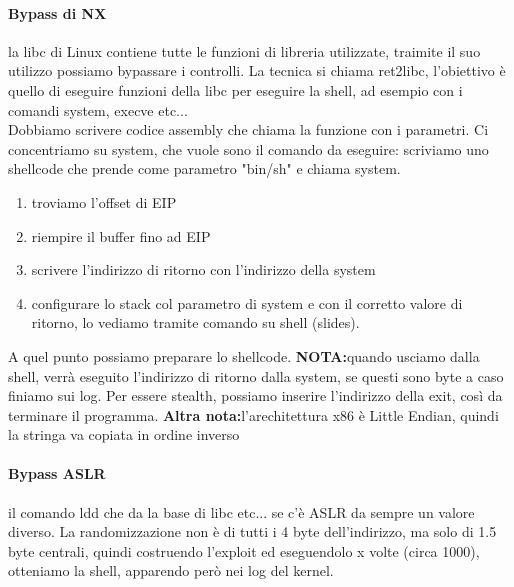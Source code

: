 \documentclass{article}
\begin{document}
\paragraph{Bypass di NX}la libc di Linux contiene tutte le funzioni di libreria utilizzate, traimite il suo utilizzo possiamo bypassare i controlli. La tecnica si chiama ret2libc, l'obiettivo è quello di eseguire funzioni della libc per eseguire la shell, ad esempio con i comandi system, execve etc...\\ Dobbiamo scrivere codice assembly che chiama la funzione con i parametri. Ci concentriamo su system, che vuole sono il comando da eseguire: scriviamo uno shellcode che prende come parametro "bin/sh" e chiama system.
\begin{enumerate}
\item troviamo l'offset di EIP
\item riempire il buffer fino ad EIP
\item scrivere l'indirizzo di ritorno con l'indirizzo della system
\item configurare lo stack col parametro di system e con il corretto valore di ritorno, lo vediamo tramite comando su shell (slides).
\end{enumerate}
A quel punto possiamo preparare lo shellcode. \textbf{NOTA:}quando usciamo dalla shell, verrà eseguito l'indirizzo di ritorno dalla system, se questi sono byte a caso finiamo sui log. Per essere stealth, possiamo inserire l'indirizzo della exit, così da terminare il programma. \textbf{Altra nota:}l'arechitettura x86 è Little Endian, quindi la stringa va copiata in ordine inverso
\paragraph{Bypass ASLR} il comando ldd che da la base di libc etc... se c'è ASLR da sempre un valore diverso. La randomizzazione non è di tutti i 4 byte dell'indirizzo, ma solo di 1.5 byte centrali, quindi costruendo l'exploit ed eseguendolo x volte (circa 1000), otteniamo la shell, apparendo però nei log del kernel.
\end{document}
